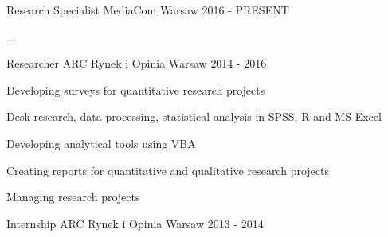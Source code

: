 \begin{cventries}
  \cventry
    {Research Specialist}
    {MediaCom}
    {Warsaw}
    {2016 - PRESENT}
    {
      \begin{cvitems}
        \item {...}
      \end{cvitems}
    }
  \cventry
    {Researcher}
    {ARC Rynek i Opinia}
    {Warsaw}
    {2014 - 2016}
    {
      \begin{cvitems}
        \item {Developing surveys for quantitative research projects}
        \item {Desk research, data processing, statistical analysis in SPSS, R and MS Excel}
        \item {Developing analytical tools using VBA}
        \item {Creating reports for quantitative and qualitative research projects}
        \item {Managing research projects}
      \end{cvitems}
    }
  \cventry
    {Internship}
    {ARC Rynek i Opinia}
    {Warsaw}
    {2013 - 2014}
    {}
\end{cventries}
